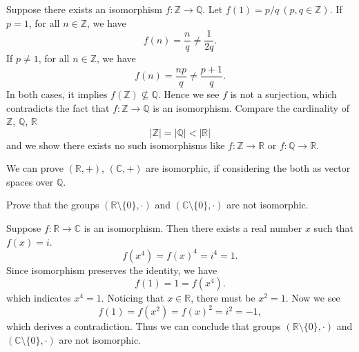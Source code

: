 \documentclass[12pt,letterpaper,boxed]{hmcpset}
\begin{document}
\begin{solution}
	Suppose there exists an isomorphism $f:\mathbb{Z}\rightarrow\mathbb{Q}$. Let $f(1)=p/q\ (p,q\in\mathbb{Z})$. If $p=1$, for all $n\in\mathbb{Z}$, we have
	\[
	f(n)=\frac{n}{q}\ne\frac{1}{2q}.
	\]
	If $p\ne1$, for all $n\in\mathbb{Z}$, we have
	\[
	f(n)=\frac{np}{q}\ne\frac{p+1}{q}.
	\]
	In both cases, it implies $f(\mathbb{Z})\nsubseteq\mathbb{Q}$.  Hence we see $f$ is not a surjection, which contradicts the fact that $f:\mathbb{Z}\rightarrow\mathbb{Q}$ is an isomorphism. Compare the cardinality of $\mathbb{Z}$, $\mathbb{Q}$, $\mathbb{R}$
	\[
	|\mathbb{Z}|=|\mathbb{Q}|<|\mathbb{R}|
	\] 
	and we show there exists no such isomorphisms like $f:\mathbb{Z}\rightarrow \mathbb{R}$ or $f:\mathbb{Q}\rightarrow \mathbb{R}$. 
	
	\noindent We can prove $(\mathbb{R}, +)$, $(\mathbb{C}, +)$ are isomorphic, if considering the both as vector spaces over $\mathbb{Q}$.
\end{solution}



\begin{problem}[4.5]
Prove that the groups $(\mathbb{R}\setminus\{0\},\cdot)$ and $(\mathbb{C}\setminus\{0\}, \cdot)$ are not isomorphic.
\end{problem}

\begin{solution}
	Suppose $f:\mathbb{R}\rightarrow\mathbb{C}$ is an isomorphism. Then there exists a real number $x$ such that $f(x)=i$. 
	\[
	f(x^4)=f(x)^4=i^4=1.
	\]
	Since isomorphism preserves the identity, we have
	\[
	f(1)=1=f(x^4).
	\]
	which indicates $x^4=1$. Noticing that $x\in\mathbb{R}$, there must be $x^2=1$. Now we see
	\[
	f(1)=f(x^2)=f(x)^2=i^2=-1,
	\]
	which derives a contradiction. Thus we can conclude that groups $(\mathbb{R}\setminus\{0\},\cdot)$ and $(\mathbb{C}\setminus\{0\}, \cdot)$ are not isomorphic.

\end{solution}
\end{document}
